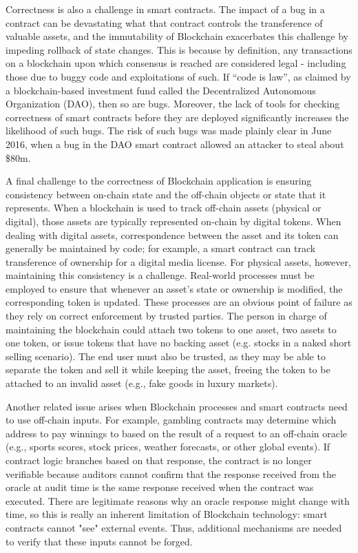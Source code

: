 Correctness is also a challenge in smart contracts. The impact of a bug in a contract can be devastating what that contract controls the transference of valuable assets, and the immutability of Blockchain exacerbates this challenge by impeding rollback of state changes. This is because by definition, any transactions on a blockchain upon which consensus is reached are considered legal - including those due to buggy code and exploitations of such. If ``code is law'', as claimed by a blockchain-based investment fund called the Decentralized Autonomous Organization (DAO), then so are bugs.  Moreover, the lack of tools for checking correctness of smart contracts before they are deployed significantly increases the likelihood of such bugs.  The risk of such bugs was made plainly clear in June 2016, when a bug in the DAO smart contract allowed an attacker to steal about \$80m.

A final challenge to the correctness of Blockchain application is ensuring consistency between on-chain state and the off-chain objects or state that it represents.  When a blockchain is used to track off-chain assets (physical or digital), those assets are typically represented on-chain by digital tokens. When dealing with digital assets, correspondence between the asset and its token can generally be maintained by code; for example, a smart contract can track transference of ownership for a digital media license. For physical assets, however, maintaining this consistency is a challenge. Real-world processes must be employed to ensure that whenever an asset's state or ownership is modified, the corresponding token is updated. These processes are an obvious point of failure as they rely on correct enforcement by trusted parties. The person in charge of maintaining the blockchain could attach two tokens to one asset, two assets to one token, or issue tokens that have no backing asset (e.g. stocks in a naked short selling scenario). The end user must also be trusted, as they may be able to separate the token and sell it while keeping the asset, freeing the token to be attached to an invalid asset (e.g., fake goods in luxury markets).

Another related issue arises when Blockchain processes and smart contracts need to use off-chain inputs.  For example, gambling contracts may determine which address to pay winnings to based on the result of a request to an off-chain oracle (e.g., sports scores, stock prices, weather forecasts, or other global events). If contract logic branches based on that response, the contract is no longer verifiable because auditors cannot confirm that the response received from the oracle at audit time is the same response received when the contract was executed. There are legitimate reasons why an oracle response might change with time, so this is really an inherent limitation of Blockchain technology: smart contracts cannot "see" external events.  Thus, additional mechanisms are needed to verify that these inputs cannot be forged.

